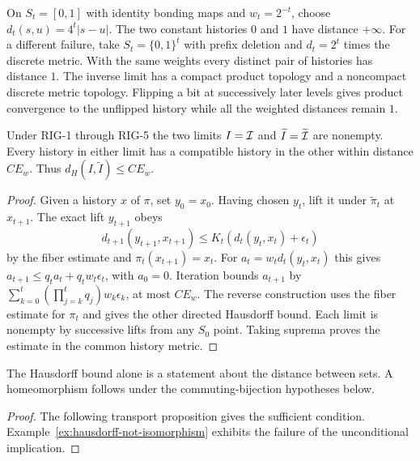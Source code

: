 \begin{example}\label{ex:weighted-tail-failures}
On $S_t=[0,1]$ with identity bonding maps and $w_t=2^{-t}$, choose $d_t(s,u)=4^t|s-u|$. The two constant histories $0$ and $1$ have distance $+\infty$. For a different failure, take $S_t=\{0,1\}^t$ with prefix deletion and $d_t=2^t$ times the discrete metric. With the same weights every distinct pair of histories has distance $1$. The inverse limit has a compact product topology and a noncompact discrete metric topology. Flipping a bit at successively later levels gives product convergence to the unflipped history while all the weighted distances remain $1$.
\end{example}

\begin{theorem}\label{thm:rigidity}
Under RIG-1 through RIG-5 the two limits $I=\mathcal{I}$ and $\widetilde I=\widetilde{\mathcal{I}}$ are nonempty. Every history in either limit has a compatible history in the other within distance $C E_w$. Thus $d_H(I,\widetilde I)\leq C E_w$.
\end{theorem}
\begin{proof}
Given a history $x$ of $\pi$, set $y_0=x_0$. Having chosen $y_t$, lift it under $\widetilde\pi_t$ at $x_{t+1}$. The exact lift $y_{t+1}$ obeys
\[
 d_{t+1}(y_{t+1},x_{t+1})\le K_t(d_t(y_t,x_t)+\epsilon_t)
\]
by the fiber estimate and $\pi_t(x_{t+1})=x_t$. For $a_t=w_t d_t(y_t,x_t)$ this gives $a_{t+1}\le q_t a_t+q_t w_t\epsilon_t$, with $a_0=0$. Iteration bounds $a_{t+1}$ by $\sum_{k=0}^t (\prod_{j=k}^t q_j)w_k\epsilon_k$, at most $C E_w$. The reverse construction uses the fiber estimate for $\pi_t$ and gives the other directed Hausdorff bound. Each limit is nonempty by successive lifts from any $S_0$ point. Taking suprema proves the estimate in the common history metric.
\end{proof}

\begin{corollary}
The Hausdorff bound alone is a statement about the distance between sets. A homeomorphism follows under the commuting-bijection hypotheses below.
\end{corollary}
\begin{proof}
The following transport proposition gives the sufficient condition. Example~\ref{ex:hausdorff-not-isomorphism} exhibits the failure of the unconditional implication.
\end{proof}


